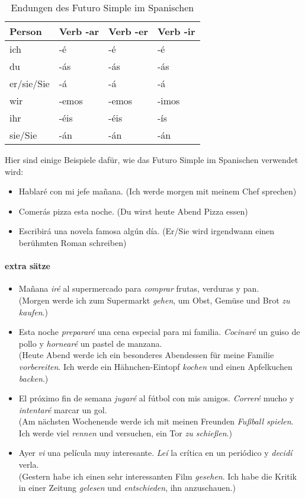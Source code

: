 \documentclass{article}
\begin{document}
\begin{table}[h!]
\centering
\begin{tabular}{@{}llll@{}}
\toprule
Person & Verb -ar & Verb -er & Verb -ir \\
\midrule
ich & -é & -é & -é \\
du & -ás & -ás & -ás \\
er/sie/Sie & -á & -á & -á \\
wir & -emos & -emos & -imos \\
ihr & -éis & -éis & -ís \\
sie/Sie & -án & -án & -án \\
\bottomrule
\end{tabular}
\caption{Endungen des Futuro Simple im Spanischen}
\label{tabla:terminaciones2}
\end{table}

Hier sind einige Beispiele dafür, wie das Futuro Simple im Spanischen verwendet wird:

\begin{itemize}
\item Hablaré con mi jefe mañana. (Ich werde morgen mit meinem Chef sprechen)
\item Comerás pizza esta noche. (Du wirst heute Abend Pizza essen)
\item Escribirá una novela famosa algún día. (Er/Sie wird irgendwann einen berühmten Roman schreiben)
\end{itemize}

\paragraph{extra s\"atze}
\begin{itemize}
\item Mañana \textit{iré} al supermercado para \textit{comprar} frutas, verduras y pan.\\
  (Morgen werde ich zum Supermarkt \textit{gehen}, um Obst, Gemüse und Brot \textit{zu kaufen}.)
\item Esta noche \textit{prepararé} una cena especial para mi familia. \textit{Cocinaré} un guiso de pollo y \textit{hornearé} un pastel de manzana. \\
  (Heute Abend werde ich ein besonderes Abendessen für meine Familie \textit{vorbereiten}. Ich werde ein Hähnchen-Eintopf \textit{kochen} und einen Apfelkuchen \textit{backen}.)
\item El próximo fin de semana \textit{jugaré} al fútbol con mis amigos. \textit{Correré} mucho y \textit{intentaré} marcar un gol.\\
  (Am nächsten Wochenende werde ich mit meinen Freunden \textit{Fußball spielen}. Ich werde viel \textit{rennen} und versuchen, ein Tor \textit{zu schießen}.)
\item Ayer \textit{vi} una película muy interesante. \textit{Leí} la crítica en un periódico y \textit{decidí} verla.\\
  (Gestern habe ich einen sehr interessanten Film \textit{gesehen}. Ich habe die Kritik in einer Zeitung \textit{gelesen} und \textit{entschieden}, ihn anzuschauen.)
\end{itemize}
\end{document}
